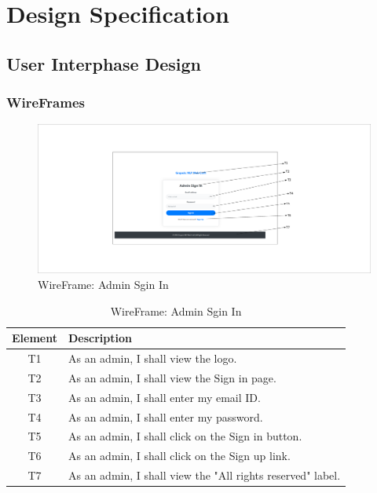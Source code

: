 \documentclass[12pt]{report}
\renewcommand{\headrulewidth}{0pt}
\begin{document}
\chapter{\Huge \bfseries Design Specification}
\renewcommand{\headrulewidth}{0.4pt} %

\section{User Interphase Design}
\subsection{WireFrames}
\begin{figure}[ht]
    \centering
    \includegraphics[width=1\textwidth, trim=10cm 5cm 10cm 5cm, clip]{Media/1 .pdf} %
    \caption{WireFrame: Admin Sgin In}
    \label{fig:drawing1}
\end{figure}



\begin{table}[h!]
    \centering
    \begin{tabular}{|c|p{10cm}|}
        \hline
        \textbf{Element} & \textbf{Description} \\
        \hline
        T1 & As an admin, I shall view the logo. \\
        \hline
        T2 & As an admin, I shall view the Sign in page. \\
        \hline
        T3 & As an admin, I shall enter my email ID. \\
        \hline
        T4 & As an admin, I shall enter my password. \\
        \hline
        T5 & As an admin, I shall click on the Sign in button. \\
        \hline
        T6 & As an admin, I shall click on the Sign up link. \\
        \hline
        T7 & As an admin, I shall view the "All rights reserved" label. \\
        \hline
    \end{tabular}
    \caption{WireFrame: Admin Sgin In}
    \label{tab:admin_actions}
\end{table}
\end{document}

